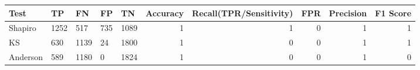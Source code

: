 \begin{tabular}{lllllrrrrr}
\toprule
Test & TP & FN & FP & TN & Accuracy & Recall(TPR/Sensitivity) & FPR & Precision & F1 Score \\
\midrule
Shapiro & 1252 & 517 & 735 & 1089 & 1 & 1 & 0 & 1 & 1 \\
KS & 630 & 1139 & 24 & 1800 & 1 & 0 & 0 & 1 & 1 \\
Anderson & 589 & 1180 & 0 & 1824 & 1 & 0 & 0 & 1 & 0 \\
\bottomrule
\end{tabular}
